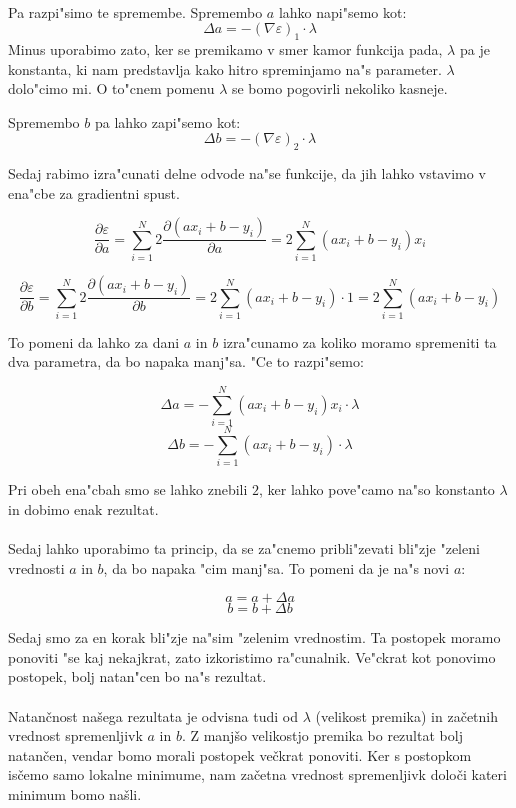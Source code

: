 \paragraph{}
Pa razpi"simo te spremembe. Spremembo $a$ lahko napi"semo kot:
\[\Delta a = -(\nabla \varepsilon)_1 \cdot \lambda\]
Minus uporabimo zato, ker se premikamo v smer kamor funkcija pada, $\lambda$ pa je konstanta, ki nam predstavlja kako hitro spreminjamo na"s parameter. $\lambda$ dolo"cimo mi. O to"cnem pomenu $\lambda$ se bomo pogovirli nekoliko kasneje.

Spremembo $b$ pa lahko zapi"semo kot:
\[\Delta b = -(\nabla \varepsilon)_2 \cdot \lambda\]

\newpage
Sedaj rabimo izra"cunati delne odvode na"se funkcije, da jih lahko vstavimo v ena"cbe za gradientni spust.

$$\frac{\partial \varepsilon}{\partial a} =
\sum_{i=1}^{N} 2 \frac{\partial (a x_i + b - y_i)}{\partial a} =
2 \sum_{i=1}^{N} (a x_i + b - y_i)x_i$$

$$\frac{\partial \varepsilon}{\partial b} =
\sum_{i=1}^{N} 2 \frac{\partial (a x_i + b - y_i)}{\partial b} =
2 \sum_{i=1}^{N} (a x_i + b - y_i)\cdot1 = 2 \sum_{i=1}^{N} (a x_i + b - y_i)$$

To pomeni da lahko za dani $a$ in $b$ izra"cunamo za koliko moramo spremeniti ta dva parametra, da bo napaka manj"sa. "Ce to razpi"semo:

\[\Delta a = -\sum_{i=1}^{N} (a x_i + b - y_i)x_i \cdot \lambda \]
\[\Delta b = -\sum_{i=1}^{N} (a x_i + b - y_i) \cdot \lambda \]

Pri obeh ena"cbah smo se lahko znebili $2$, ker lahko pove"camo na"so konstanto $\lambda$ in dobimo enak rezultat.

\paragraph{}
Sedaj lahko uporabimo ta princip, da se za"cnemo pribli"zevati bli"zje "zeleni vrednosti $a$ in $b$, da bo napaka "cim manj"sa. To pomeni da je na"s novi $a$:

\[a = a + \Delta a \]
\[b = b + \Delta b \]

Sedaj smo za en korak bli"zje na"sim "zelenim vrednostim. Ta postopek moramo ponoviti "se kaj nekajkrat, zato izkoristimo ra"cunalnik. Ve"ckrat kot ponovimo postopek, bolj natan"cen bo na"s rezultat.

\paragraph{}
Natančnost našega rezultata je odvisna tudi od $\lambda$ (velikost premika) in začetnih vrednost spremenljivk $a$ in $b$. Z manjšo velikostjo premika bo rezultat bolj natančen, vendar bomo morali postopek večkrat ponoviti. Ker s postopkom isčemo samo lokalne minimume, nam začetna vrednost spremenljivk določi kateri minimum bomo našli.